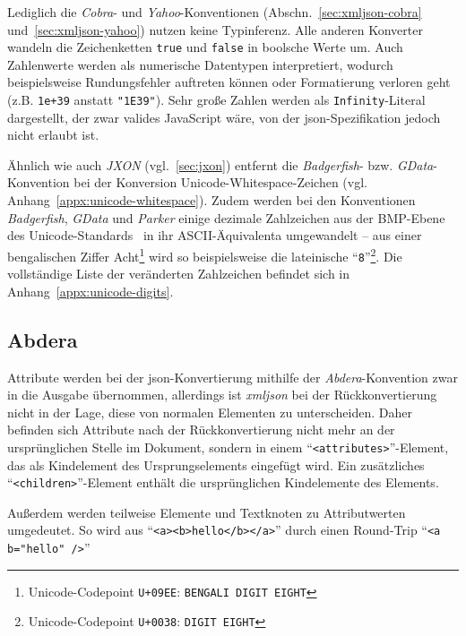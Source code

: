 Lediglich die \emph{Cobra}- und \emph{Yahoo}-Konventionen (Abschn.~\ref{sec:xmljson-cobra} und~\ref{sec:xmljson-yahoo}) nutzen keine Typinferenz. Alle anderen Konverter wandeln die Zeichenketten \texttt{true} und \texttt{false} in boolsche Werte um. Auch Zahlenwerte werden als numerische Datentypen interpretiert, wodurch beispielsweise Rundungsfehler auftreten können oder Formatierung verloren geht (z.B. \texttt{1e+39} anstatt \texttt{"1E39"}). Sehr große Zahlen werden als \texttt{Infinity}-Literal dargestellt, der zwar valides JavaScript wäre, von der \acrshort{json}-Spezifikation jedoch nicht erlaubt ist.

Ähnlich wie auch \emph{JXON} (vgl.~\ref{sec:jxon}) entfernt die \emph{Badgerfish}- bzw. \emph{GData}-Konvention bei der Konversion Unicode-Whitespace-Zeichen (vgl. Anhang~\ref{appx:unicode-whitespace}). Zudem werden bei den Konventionen \emph{Badgerfish}, \emph{GData} und \emph{Parker} einige dezimale Zahlzeichen aus der BMP-Ebene des Unicode-Standards~\cite[S.~49]{unicode9} in ihr ASCII-Äquivalenta umgewandelt -- aus einer bengalischen Ziffer Acht\footnote{Unicode-Codepoint \texttt{U+09EE}: \texttt{BENGALI DIGIT EIGHT}} wird so beispielsweise die lateinische \enquote{\texttt{8}}\footnote{Unicode-Codepoint \texttt{U+0038}: \texttt{DIGIT EIGHT}}. Die vollständige Liste der veränderten Zahlzeichen befindet sich in Anhang~\ref{appx:unicode-digits}.

\subsection{Abdera}
\label{sec:xmljson-abdera}

Attribute werden bei der \acrshort{json}-Konvertierung mithilfe der \emph{Abdera}-Konvention zwar in die Ausgabe übernommen, allerdings ist \emph{xmljson} bei der Rückkonvertierung nicht in der Lage, diese von normalen Elementen zu unterscheiden. Daher befinden sich Attribute nach der Rückkonvertierung nicht mehr an der ursprünglichen Stelle im Dokument, sondern in einem \enquote{\texttt{<attributes>}}-Element, das als Kindelement des Ursprungselements eingefügt wird. Ein zusätzliches \enquote{\texttt{<children>}}-Element enthält die ursprünglichen Kindelemente des Elements.

Außerdem werden teilweise Elemente und Textknoten zu Attributwerten umgedeutet. So wird aus \enquote{\texttt{<a><b>hello</b></a>}} durch einen Round-Trip \enquote{\texttt{<a b="hello" />}}

